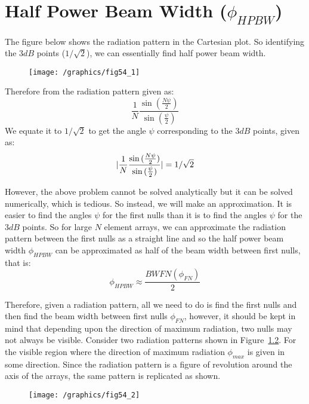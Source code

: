 \chapter{Half Power Beam Width ($\phi_{HPBW}$)}
The figure below shows the radiation pattern in the Cartesian plot. So identifying the $3dB$ points ($1/\sqrt{2}$), we can essentially find half power beam width.
\begin{figure}[h]
\centering
\texttt{[image: /graphics/fig54\_1]}
\caption{}
\label{54.1}
\end{figure}

Therefore from the radiation pattern given as:
$$
\frac{1}{N} \frac{\sin{(\frac{N \psi}{2})}}{\sin{(\frac{ \psi}{2})}}
$$
We equate it to $1/\sqrt{2}$ to get the angle $\psi$ corresponding to the $3dB$ points, given as:
\begin{equation}
\arrowvert \frac{1}{N} \frac{\sin{(\frac{N \psi}{2})}}{\sin{(\frac{ \psi}{2})}} \arrowvert = 1/\sqrt{2}
\end{equation}

However, the above problem cannot be solved analytically but it can be solved numerically, which is tedious. So instead, we will make an approximation. It is easier to find the angles $\psi$ for the first nulls than it is to find the angles $\psi$ for the $3dB$ points. So for large $N$ element arrays, we can approximate the radiation pattern between the first nulls as a straight line and so the half power beam width $\phi_{HPBW}$ can be approximated as half of the beam width between first nulls, that is:
\begin{equation}
\phi_{HPBW} \approx \frac{BWFN (\phi_{FN})}{2}
\end{equation}

Therefore, given a radiation pattern, all we need to do is find the first nulls and then find the beam width between first nulls $\phi_{FN}$, however, it should be kept in mind that depending upon the direction of maximum radiation, two nulls may not always be visible. Consider two radiation patterns shown in Figure~\ref{54.2}. For the visible region where the direction of maximum radiation $\phi_{max}$ is given in some direction. Since the radiation pattern is a figure of revolution around the axis of the arrays, the same pattern is replicated as shown.
\begin{figure}[h]
\centering
\texttt{[image: /graphics/fig54\_2]}
\caption{}
\label{54.2}
\end{figure}

